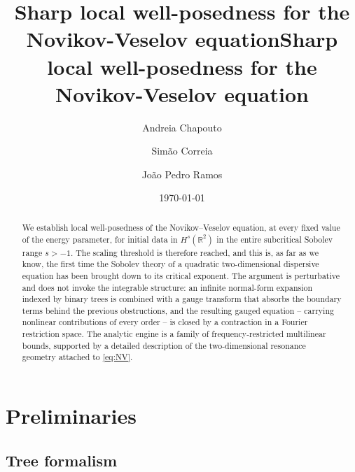 \documentclass[a4paper,
11pt,  reqno]{amsart}
\title{Sharp local well-posedness for the Novikov-Veselov equation}
\title[Sharp LWP for the Novikov-Veselov equation]{Sharp local well-posedness for the Novikov-Veselov equation}
\author[A.~Chapouto \and S.~Correia \and J.~P.~Ramos]
{Andreia Chapouto \and Sim\~ao Correia \and Jo\~ao Pedro Ramos}
\date{\today}
\newcommand{\5}{\textup{V}}
\theoremstyle{remark}
\newcommand{\R}{\mathbb{R}}
\numberwithin{equation}{section}
\numberwithin{theorem}{section}
\begin{document}
\begin{abstract}
We establish local well-posedness of the Novikov--Veselov equation, at every fixed value of the energy parameter, for initial data in $H^s(\R^2)$ in the entire subcritical Sobolev range $s>-1$. The scaling threshold is therefore reached, and this is, as far as we know, the first time the Sobolev theory of a quadratic two-dimensional dispersive equation has been brought down to its critical exponent. The argument is perturbative and does not invoke the integrable structure: an infinite normal-form expansion indexed by binary trees is combined with a gauge transform that absorbs the boundary terms behind the previous obstructions, and the resulting gauged equation -- carrying nonlinear contributions of every order -- is closed by a contraction in a Fourier restriction space. The analytic engine is a family of frequency-restricted multilinear bounds, supported by a detailed description of the two-dimensional resonance geometry attached to \eqref{eq:NV}.
\end{abstract}

\maketitle



\section{Preliminaries}\label{sec:prem}


\subsection{Tree formalism}	
\label{SUB:tree}
\end{document}
